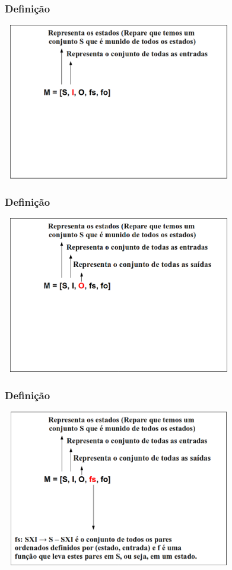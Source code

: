 \documentclass{beamer}
\begin{document}
  \begin{frame}
   \frametitle{Definição}
       \includegraphics[height=2.7in, width=4in]{entendendo_definicao_3.png}
  \end{frame}

  \begin{frame}
   \frametitle{Definição}
       \includegraphics[height=2.7in, width=4in]{entendendo_definicao_4.png}
  \end{frame}

  \begin{frame}
   \frametitle{Definição}
       \includegraphics[height=2.7in, width=4in]{entendendo_definicao_5.png}
  \end{frame}
\end{document}
